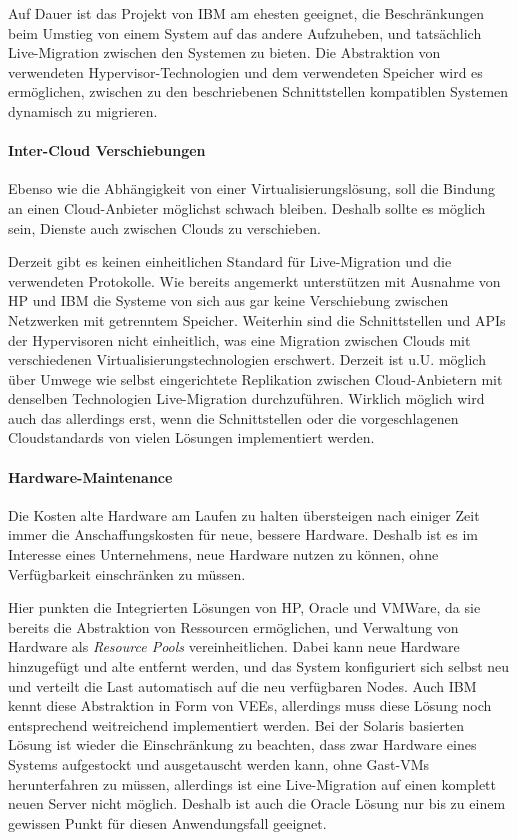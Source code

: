 Auf Dauer ist das \reservoir Projekt von IBM am ehesten geeignet, die
Beschränkungen beim Umstieg von einem System auf das andere
Aufzuheben, und tatsächlich Live-Migration zwischen den Systemen zu
bieten. Die Abstraktion von verwendeten Hypervisor-Technologien und
dem verwendeten Speicher wird es ermöglichen, zwischen zu den
beschriebenen Schnittstellen kompatiblen Systemen dynamisch zu
migrieren.

\paragraph{Inter-Cloud Verschiebungen}
Ebenso wie die Abhängigkeit von einer Virtualisierungslösung, soll die
Bindung an einen Cloud-Anbieter möglichst schwach bleiben. Deshalb
sollte es möglich sein, Dienste auch zwischen Clouds zu verschieben.

Derzeit gibt es keinen einheitlichen Standard für Live-Migration und
die verwendeten Protokolle. Wie bereits angemerkt unterstützen mit
Ausnahme von HP und IBM die Systeme von sich aus gar keine
Verschiebung zwischen Netzwerken mit getrenntem Speicher. Weiterhin
sind die Schnittstellen und APIs der Hypervisoren nicht einheitlich,
was eine Migration zwischen Clouds mit verschiedenen
Virtualisierungstechnologien erschwert. Derzeit ist u.U. möglich über
Umwege wie selbst eingerichtete Replikation zwischen Cloud-Anbietern
mit denselben Technologien Live-Migration durchzuführen. Wirklich
möglich wird auch das allerdings erst, wenn die \reservoir
Schnittstellen oder die vorgeschlagenen Cloudstandards von vielen
Lösungen implementiert werden.

\paragraph{Hardware-Maintenance}
Die Kosten alte Hardware am Laufen zu halten übersteigen nach einiger
Zeit immer die Anschaffungskosten für neue, bessere Hardware. Deshalb
ist es im Interesse eines Unternehmens, neue Hardware nutzen zu
können, ohne Verfügbarkeit einschränken zu müssen.

Hier punkten die Integrierten Lösungen von HP, Oracle und VMWare, da
sie bereits die Abstraktion von Ressourcen ermöglichen, und Verwaltung
von Hardware als \emph{Resource Pools} vereinheitlichen. Dabei kann
neue Hardware hinzugefügt und alte entfernt werden, und das System
konfiguriert sich selbst neu und verteilt die Last automatisch auf die
neu verfügbaren Nodes. Auch IBM kennt diese Abstraktion in Form von
\acp{VEE}, allerdings muss diese Lösung noch entsprechend weitreichend
implementiert werden.  Bei der Solaris basierten Lösung ist wieder die
Einschränkung zu beachten, dass zwar Hardware eines Systems
aufgestockt und ausgetauscht werden kann, ohne Gast-VMs herunterfahren
zu müssen, allerdings ist eine Live-Migration auf einen komplett neuen
Server nicht möglich. Deshalb ist auch die Oracle Lösung nur bis zu
einem gewissen Punkt für diesen Anwendungsfall geeignet.


